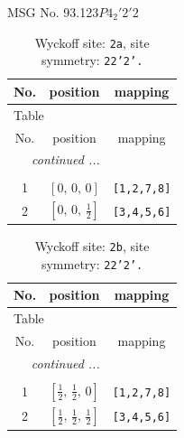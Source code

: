 \documentclass[fleqn,8pt]{jsarticle}
\begin{document}
\setcounter{MaxMatrixCols}{32}

\renewcommand{\tablename}{Table~}
\renewcommand{\figurename}{Figure~}
\begin{center}
\LARGE
MSG No. 93.123\quad$P4_{2}'2'2$
\end{center}
\renewcommand{\arraystretch}{1.2}
\begin{longtable}{ccc}
\caption{Wyckoff site: {\tt 2a}, site symmetry: {\tt 22'2'.}}
 \\
 \hline \hline
No. & position & mapping \\ \hline \endfirsthead

\multicolumn{2}{l}{\tablename\ \thetable{}} \\
 \hline \hline
No. & position & mapping \\ \hline \endhead

 \hline \hline
\multicolumn{2}{r}{\footnotesize\it continued ...} \\ \endfoot

 \hline \hline
\multicolumn{2}{r}{} \\ \endlastfoot

1 & $\left[ 0,\, 0,\, 0 \right]$ & {\tt [1,2,7,8]} \\ \hline
2 & $\left[ 0,\, 0,\, \frac{1}{2} \right]$ & {\tt [3,4,5,6]} \\
\end{longtable}
\renewcommand{\arraystretch}{1.2}
\begin{longtable}{ccc}
\caption{Wyckoff site: {\tt 2b}, site symmetry: {\tt 22'2'.}}
 \\
 \hline \hline
No. & position & mapping \\ \hline \endfirsthead

\multicolumn{2}{l}{\tablename\ \thetable{}} \\
 \hline \hline
No. & position & mapping \\ \hline \endhead

 \hline \hline
\multicolumn{2}{r}{\footnotesize\it continued ...} \\ \endfoot

 \hline \hline
\multicolumn{2}{r}{} \\ \endlastfoot

1 & $\left[ \frac{1}{2},\, \frac{1}{2},\, 0 \right]$ & {\tt [1,2,7,8]} \\ \hline
2 & $\left[ \frac{1}{2},\, \frac{1}{2},\, \frac{1}{2} \right]$ & {\tt [3,4,5,6]} \\
\end{longtable}
\end{document}
